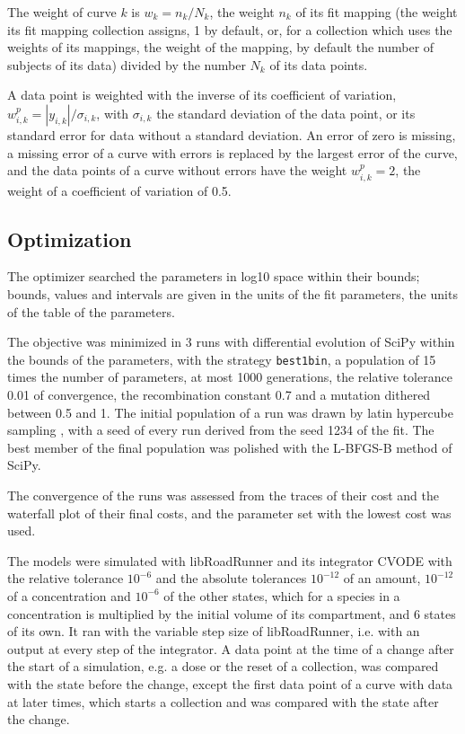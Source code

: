 The weight of curve $k$ is $w_k = n_k / N_k$, the weight $n_k$ of its fit mapping (the weight its fit mapping collection assigns, 1 by default, or, for a collection which uses the weights of its mappings, the weight of the mapping, by default the number of subjects of its data) divided by the number $N_k$ of its data points.

A data point is weighted with the inverse of its coefficient of variation, $w^{p}_{i,k} = |y_{i,k}| / \sigma_{i,k}$, with $\sigma_{i,k}$ the standard deviation of the data point, or its standard error for data without a standard deviation. An error of zero is missing, a missing error of a curve with errors is replaced by the largest error of the curve, and the data points of a curve without errors have the weight $w^{p}_{i,k} = 2$, the weight of a coefficient of variation of 0.5.

\subsection{Optimization}

The optimizer searched the parameters in log10 space within their bounds; bounds, values and intervals are given in the units of the fit parameters, the units of the table of the parameters.

The objective was minimized in 3 runs with differential evolution \cite{Storn1997} of SciPy \cite{Virtanen2020} within the bounds of the parameters, with the strategy \texttt{best1bin}, a population of 15 times the number of parameters, at most 1000 generations, the relative tolerance 0.01 of convergence, the recombination constant 0.7 and a mutation dithered between 0.5 and 1. The initial population of a run was drawn by latin hypercube sampling \cite{McKay1979}, with a seed of every run derived from the seed 1234 of the fit. The best member of the final population was polished with the L-BFGS-B method of SciPy.

The convergence of the runs was assessed from the traces of their cost and the waterfall plot of their final costs, and the parameter set with the lowest cost was used.

The models were simulated with libRoadRunner \cite{Welsh2023} and its integrator CVODE \cite{Hindmarsh2005} with the relative tolerance $10^{-6}$ and the absolute tolerances $10^{-12}$ of an amount, $10^{-12}$ of a concentration and $10^{-6}$ of the other states, which for a species in a concentration is multiplied by the initial volume of its compartment, and 6 states of its own. It ran with the variable step size of libRoadRunner, i.e. with an output at every step of the integrator. A data point at the time of a change after the start of a simulation, e.g. a dose or the reset of a collection, was compared with the state before the change, except the first data point of a curve with data at later times, which starts a collection and was compared with the state after the change.

